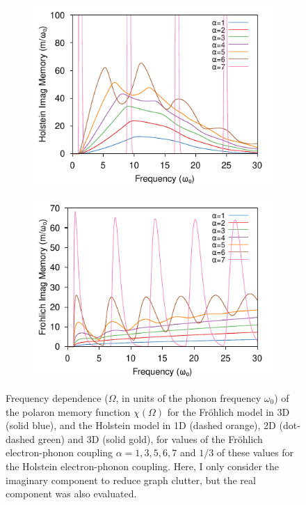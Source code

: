 \begin{figure}
  \begin{subfigure}[b]{0.49\textwidth}
    \includegraphics[width=\textwidth]{figures/holstein-3d-imag-memory-freq-COLOUR.pdf}
  \end{subfigure}
  \begin{subfigure}[b]{0.49\textwidth}
    \includegraphics[width=\textwidth]{figures/frohlich-3d-imag-memory-freq-COLOUR.pdf}
  \end{subfigure}
  \caption{Frequency dependence ($\Omega$, in units of the phonon frequency $\omega_0$) of the polaron memory function $\chi(\Omega)$ for the Fr\"ohlich model in 3D (solid blue), and the Holstein model in 1D (dashed orange), 2D (dot-dashed green) and 3D (solid gold), for values of the Fr\"ohlich electron-phonon coupling $\alpha = 1, 3, 5,6, 7$ and $1/3$ of these values for the Holstein electron-phonon coupling. Here, I only consider the imaginary component to reduce graph clutter, but the real component was also evaluated.} 
  \label{fig:im_mem_freq}
\end{figure}
